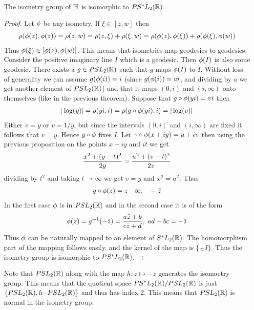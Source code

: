 \begin{theorem}
  The isometry group of $\mathbb{H}$ is isomorphic to $PS^*L_2(\mathbb{R})$.
\end{theorem}
\begin{proof}
  Let $\phi$ be any isometry. If $\xi\in [z,w]$ then
  \begin{align*}
    \rho(\phi(z), \phi(z)) = \rho(z, w) = \rho(z,\xi) + \rho(\xi,w) = \rho(\phi(z), \phi(\xi)) + \rho(\phi(\xi), \phi(w))
  \end{align*}
  Thus $\phi(\xi) \in [\phi(z), \phi(w)]$. This means that isometries map geodesics to geodesics. Consider the positive imaginary line $I$ which is a geodesic. Then $\phi(I)$ is also some geodesic. There exists a $g\in PSL_2(\mathbb{R})$ such that $g$ maps $\phi(I)$ to $I$. Without loss of generality we can assume $g(\phi(i)) = i$ (since $g(\phi(i)) = ai$, and dividing by $a$ we get another element of $PSL_2(\mathbb{R})$) and that it maps $(0,i)$ and $(i,\infty)$ onto themselves (like in the previous theorem). Suppose that $g\circ\phi(yi) = vi$ then
  \begin{align*}
    |\log(y)| = \rho(yi, i) = \rho(g\circ\phi(yi), i) = |\log(v)|
  \end{align*}
  Either $v = y$ or $v = 1/y$, but since the intervals $(0,i)$ and $(i,\infty)$ are fixed it follows that $v = y$. Hence $g\circ\phi$ fixes $I$. Let $\gamma\circ\phi(x+iy) = u+iv$ then using the previous proposition on the points $x+iy$ and $it$ we get
  \begin{align*}
    \frac{x^2 + (y-t)^2}{2y} = \frac{u^2 + (v-t)^2}{2v} 
  \end{align*}
  dividing by $t^2$ and taking $t\to \infty$ we get $v = y$ and $x^2 = u^2$. Thus
  \begin{align*}
    g\circ\p(z) = z \qq{or,} -\bar{z}
  \end{align*}
  In the first case $\phi$ is in $PSL_2(\mathbb{R})$ and in the second case it is of the form
  \begin{align*}
    \phi(z) = g^{-1}(-\bar{z}) = \frac{a\bar{z} + b}{c\bar{z} + d},\ ad-bc = -1
  \end{align*}
  Thus $\phi$ can be naturally mapped to an element of $S^*L_2(\mathbb{R})$. The homomorphism part of the mapping follows easily, and the kernel of the map is $\{\pm I\}$. Thus the isometry group is isomorphic to $PS^*L_2(\mathbb{R})$.
\end{proof}
Note that $PSL_2(\mathbb{R})$ along with the map $h:z\mapsto -\bar{z}$ generates the isomoetry group. This means that the quotient space $PS^*L_2(\mathbb{R})/PSL_2(\mathbb{R})$ is just $\{PSL_2(\mathbb{R}), h\cdot PSL_2(\mathbb{R})\}$ and thus has index $2$. This means that $PSL_2(\mathbb{R})$ is normal in the isometry group.\\

